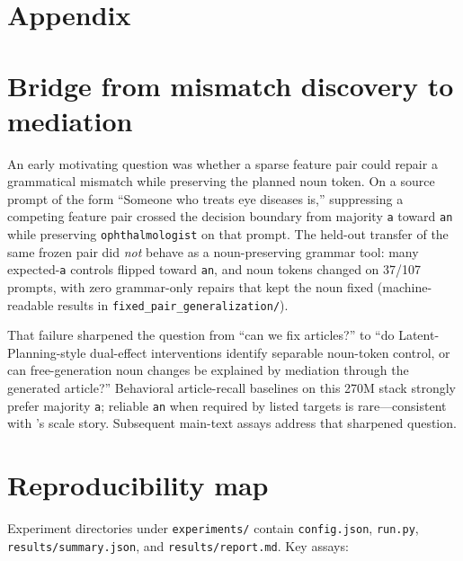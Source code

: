 \appendix

\section*{Appendix}

\section{Bridge from mismatch discovery to mediation}
\label{sec-app-bridge}

An early motivating question was whether a sparse feature pair could repair
a grammatical mismatch while preserving the planned noun token. On a source
prompt of the form ``Someone who treats eye diseases is,'' suppressing a
competing feature pair crossed the decision boundary from majority
\texttt{a} toward \texttt{an} while preserving \texttt{ophthalmologist}
on that prompt. The held-out transfer of the same frozen pair did
\emph{not} behave as a noun-preserving grammar tool: many expected-\texttt{a}
controls flipped toward \texttt{an}, and noun tokens changed on 37/107
prompts, with zero grammar-only repairs that kept the noun fixed
(machine-readable results in \texttt{fixed\_pair\_generalization/}).

That failure sharpened the question from ``can we fix articles?'' to
``do Latent-Planning-style dual-effect interventions identify separable
noun-token control, or can free-generation noun changes be explained by
mediation through the generated article?'' Behavioral article-recall
baselines on this 270M stack strongly prefer majority \texttt{a}; reliable
\texttt{an} when required by listed targets is rare---consistent with
\citet{hanna2026latent}'s scale story. Subsequent main-text assays address
that sharpened question.

\section{Reproducibility map}
\label{app:reproducibility}

Experiment directories under \texttt{experiments/} contain
\texttt{config.json}, \texttt{run.py}, \texttt{results/summary.json}, and
\texttt{results/report.md}. Key assays:

